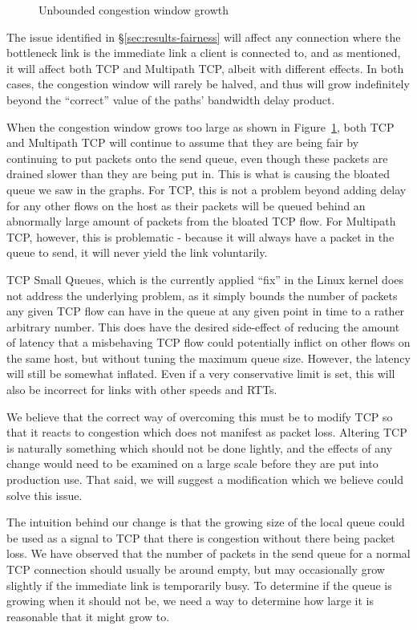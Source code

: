 \begin{figure}[h]
 \centering
 
 \caption{Unbounded congestion window growth}\label{graph:logarithmic}
\end{figure}

The issue identified in \S\ref{sec:results-fairness} will affect any
connection where the bottleneck link is the immediate link a client is connected
to, and as mentioned, it will affect both TCP and Multipath TCP, albeit with
different effects. In both cases, the congestion window will rarely be halved,
and thus will grow indefinitely beyond the ``correct'' value of the paths'
bandwidth delay product.

When the congestion window grows too large as shown in
Figure~\ref{graph:logarithmic}, both TCP and Multipath TCP will continue to
assume that they are being fair by continuing to put packets onto the send
queue, even though these packets are drained slower than they are being put in.
This is what is causing the bloated queue we saw in the graphs. For TCP, this is
not a problem beyond adding delay for any other flows on the host as their
packets will be queued behind an abnormally large amount of packets from the
bloated TCP flow. For Multipath TCP, however, this is problematic - because it
will always have a packet in the queue to send, it will never yield the link
voluntarily.

TCP Small Queues, which is the currently applied ``fix'' in the Linux kernel
does not address the underlying problem, as it simply bounds the number of
packets any given TCP flow can have in the queue at any given point in time to a
rather arbitrary number. This does have the desired side-effect of reducing the
amount of latency that a misbehaving TCP flow could potentially inflict on other
flows on the same host, but without tuning the maximum queue size. However, the
latency will still be somewhat inflated. Even if a very conservative limit is
set, this will also be incorrect for links with other speeds and RTTs.

We believe that the correct way of overcoming this must be to modify TCP so that
it reacts to congestion which does not manifest as packet loss. Altering TCP is
naturally something which should not be done lightly, and the effects of any
change would need to be examined on a large scale before they are put into
production use. That said, we will suggest a modification which we believe could
solve this issue.

The intuition behind our change is that the growing size of the local queue
could be used as a signal to TCP that there is congestion without there being
packet loss. We have observed that the number of packets in the send queue for a
normal TCP connection should usually be around empty, but may occasionally grow
slightly if the immediate link is temporarily busy. To determine if the queue is
growing when it should not be, we need a way to determine how large it is
reasonable that it might grow to.

